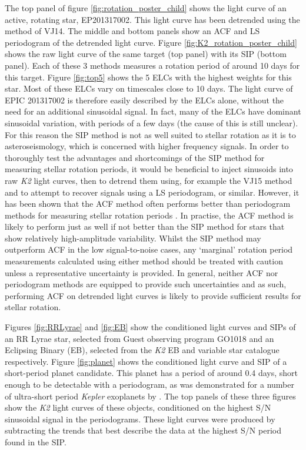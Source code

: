 \documentclass[useAMS, usenatbib, preprint, 12pt]{aastex}
\begin{document}
The top panel of figure \ref{fig:rotation_poster_child} shows the light curve
of an active, rotating star, EP201317002.
This light curve has been detrended using the method of
VJ14.
The middle and bottom panels show an ACF and LS periodogram of the
detrended light curve.
Figure \ref{fig:K2_rotation_poster_child} shows the raw light curve of the
same target (top panel) with its SIP (bottom panel).
Each of these 3 methods measures a rotation period of around 10 days for this
target.
Figure \ref{fig:top5} shows the 5 ELCs with the highest weights for this star.
Most of these ELCs vary on timescales close to 10 days.
The light curve of EPIC 201317002 is therefore easily described by the ELCs
alone, without the need for an additional sinusoidal signal.
In fact, many of the ELCs have dominant sinusoidal variation, with periods
of a few days (the cause of this is still unclear).
For this reason the SIP method is not as well suited to stellar rotation as it
is to asteroseismology, which is concerned with higher frequency signals.
In order to thoroughly test the advantages and shortcomings of the SIP method
for measuring stellar rotation periods, it would be beneficial to inject
sinusoids into raw {\it K2} light curves, then to detrend them using, for
example the VJ15 method and to attempt to recover signals using a LS
periodogram, or similar.
However, it has been shown that the ACF method often performs better than
periodogram methods for measuring stellar rotation periods
\citep[][]{McQuillan2013, McQuillan2013b, Mazeh2015}.
In practise, the ACF method is likely to perform just as well if not better
than the SIP method for stars that show relatively high-amplitude variability.
Whilst the SIP method may outperform ACF in the low signal-to-noise cases,
any `marginal' rotation period measurements calculated using either method
should be treated with caution unless a representative uncertainty is provided.
In general, neither ACF nor periodogram methods are equipped to provide such
uncertainties and as such, performing ACF on detrended light curves is likely
to provide sufficient results for stellar rotation.

Figures \ref{fig:RRLyrae} and \ref{fig:EB} show the conditioned light curves
and SIPs of an RR Lyrae star, selected from Guest observing program GO1018 and
an Eclipsing Binary (EB), selected from the \citet{Armstrong2015} {\it K2} EB
and variable star catalogue respectively.
Figure \ref{fig:planet} shows the conditioned light curve and SIP of a
short-period planet candidate.
This planet has a period of around 0.4 days, short enough to be detectable
with a periodogram, as was demonstrated for a number of ultra-short
period {\it Kepler} exoplanets by \citet{Sanchis-Ojeda2014}.
The top panels of these three figures show the {\it K2} light curves of these
objects, conditioned on the highest S/N sinusoidal signal in the
periodograms.
These light curves were produced by subtracting the trends that best describe
the data at the highest S/N period found in the SIP.
\end{document}
